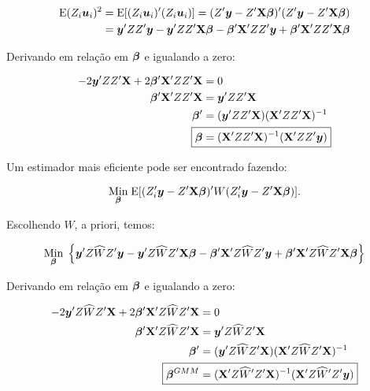 \documentclass[11pt, oneside, a4paper, article]{article}
\numberwithin{equation}{section}
\begin{document}
\begin{description}
\vspace{-1 em}
\begin{align*}
\text{E}( Z_{i}\boldsymbol{u}_{i} )^2 
&=
\text{E}[ ( Z_{i}\boldsymbol{u}_{i} )' ( Z_{i}\boldsymbol{u}_{i} ) ]
=
( Z' \boldsymbol{y} - Z' \mathbf{X} \boldsymbol{\beta} )' ( Z' \boldsymbol{y} - Z' \mathbf{X} \boldsymbol{\beta} )
\\
&=
\boldsymbol{y}' ZZ' \boldsymbol{y}
-
\boldsymbol{y}' ZZ' \mathbf{X} \boldsymbol{\beta}
-
\boldsymbol{\beta}' \mathbf{X}' ZZ' \boldsymbol{y}
+
\boldsymbol{\beta}' \mathbf{X}' ZZ' \mathbf{X} \boldsymbol{\beta}
\end{align*}

Derivando em relação em $\boldsymbol{\beta}$ e igualando a zero:

\vspace{-1 em}
\begin{align*}
-2 \yvec' ZZ' \Xmat + 2 \betavec'\Xmat' ZZ' \Xmat &= 0
\\
\betavec'\Xmat' ZZ' \Xmat &= \yvec' ZZ' \Xmat 
\\
\betavec' &= ( \yvec' ZZ' \Xmat ) ( \Xmat' ZZ' \Xmat )^{-1}
\\
\Aboxed{
\betavec &= ( \Xmat' ZZ' \Xmat )^{-1} ( \Xmat' ZZ' \yvec ) }
\end{align*}

Um estimador mais eficiente pode ser encontrado fazendo:

\vspace{-1 em}
\begin{align*}
\underset{\boldsymbol{\beta}}{\text{Min}} \;
\text{E}[ ( Z_{i}' \boldsymbol{y} - Z' \mathbf{X} \boldsymbol{\beta} )' W ( Z_{i}' \boldsymbol{y} - Z' \mathbf{X} \boldsymbol{\beta} ) ].
\end{align*}

\noindent
Escolhendo $\widehat{W}$, a priori, temos:

\vspace{-1 em}
\begin{align*}
\underset{\boldsymbol{\beta}}{\text{Min}} \;
\left\{ 
\boldsymbol{y}' Z \widehat{W} Z' \boldsymbol{y}
-
\boldsymbol{y}' Z \widehat{W} Z' \mathbf{X} \boldsymbol{\beta}
-
\boldsymbol{\beta}' \mathbf{X}'  Z \widehat{W} Z' \boldsymbol{y}
+
\boldsymbol{\beta}' \mathbf{X}'  Z \widehat{W} Z' \mathbf{X} \boldsymbol{\beta}
\right\}
\end{align*}

Derivando em relação em $\boldsymbol{\beta}$ e igualando a zero:

\vspace{-1 em}
\begin{align*}
-2 \yvec' Z \widehat{W} Z' \Xmat + 2 \betavec'\Xmat' Z \widehat{W} Z' \Xmat &= 0
\\
\betavec'\Xmat' Z \widehat{W} Z' \Xmat &= \yvec' Z \widehat{W} Z' \Xmat 
\\
\betavec' &= ( \yvec' Z \widehat{W} Z' \Xmat ) ( \Xmat' Z \widehat{W} Z' \Xmat )^{-1}
\\
\Aboxed{
\betavec^{GMM} &= ( \Xmat' Z \widehat{W}' Z' \Xmat )^{-1} ( \Xmat' Z \widehat{W}' Z' \yvec ) }
\end{align*}


\end{description}
\end{document}
